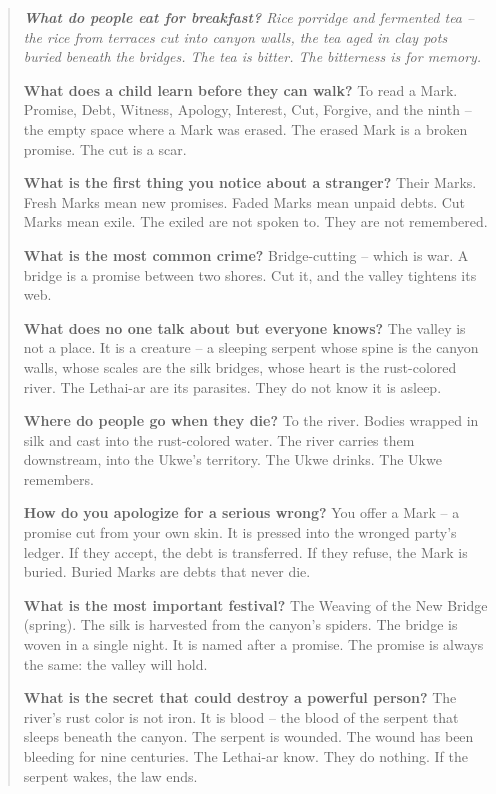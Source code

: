 \documentclass[12pt,oneside]{book}
\newenvironment{almanac}
  {\begin{quote}\small\itshape}
  {\end{quote}}
\begin{document}
\vspace{1em}
\begin{almanac}
\textbf{What do people eat for breakfast?} Rice porridge and fermented tea -- the rice from terraces cut into canyon walls, the tea aged in clay pots buried beneath the bridges. The tea is bitter. The bitterness is for memory.

\textbf{What does a child learn before they can walk?} To read a Mark. Promise, Debt, Witness, Apology, Interest, Cut, Forgive, and the ninth -- the empty space where a Mark was erased. The erased Mark is a broken promise. The cut is a scar.

\textbf{What is the first thing you notice about a stranger?} Their Marks. Fresh Marks mean new promises. Faded Marks mean unpaid debts. Cut Marks mean exile. The exiled are not spoken to. They are not remembered.

\textbf{What is the most common crime?} Bridge-cutting -- which is war. A bridge is a promise between two shores. Cut it, and the valley tightens its web.

\textbf{What does no one talk about but everyone knows?} The valley is not a place. It is a creature -- a sleeping serpent whose spine is the canyon walls, whose scales are the silk bridges, whose heart is the rust-colored river. The Lethai-ar are its parasites. They do not know it is asleep.

\textbf{Where do people go when they die?} To the river. Bodies wrapped in silk and cast into the rust-colored water. The river carries them downstream, into the Ukwe's territory. The Ukwe drinks. The Ukwe remembers.

\textbf{How do you apologize for a serious wrong?} You offer a Mark -- a promise cut from your own skin. It is pressed into the wronged party's ledger. If they accept, the debt is transferred. If they refuse, the Mark is buried. Buried Marks are debts that never die.

\textbf{What is the most important festival?} The Weaving of the New Bridge (spring). The silk is harvested from the canyon's spiders. The bridge is woven in a single night. It is named after a promise. The promise is always the same: the valley will hold.

\textbf{What is the secret that could destroy a powerful person?} The river's rust color is not iron. It is blood -- the blood of the serpent that sleeps beneath the canyon. The serpent is wounded. The wound has been bleeding for nine centuries. The Lethai-ar know. They do nothing. If the serpent wakes, the law ends.
\end{almanac}
\end{document}
